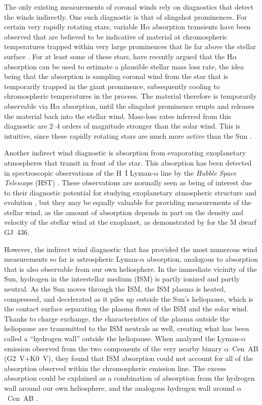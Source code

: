\documentclass[preprint]{aastex}
\begin{document}
     The only existing measurements of coronal winds rely on diagnostics
that detect the winds indirectly.  One such diagnostic is that of
slingshot prominences.  For certain very rapidly rotating stars, variable
H$\alpha$ absorption transients have been observed that are
believed to be indicative of material at chromospheric
temperatures trapped within very large prominences that lie far above
the stellar surface \citep{acc89}.  For at least
some of these stars, \citet{mj19} have recently argued
that the H$\alpha$ absorption can be used to estimate a plausible stellar
mass loss rate, the idea being that the absorption is sampling coronal wind
from the star that is temporarily trapped in the giant prominence,
subsequently cooling to chromospheric temperatures in the process.  The
material therefore is temporarily observable via H$\alpha$ absorption,
until the slingshot prominence erupts and releases the material
back into the stellar wind.  Mass-loss rates inferred from this diagnostic
are 2--4 orders of magnitude stronger than the solar wind.  This is
intuitive, since these rapidly rotating stars are much more active than
the Sun \citep{mj19}.

     Another indirect wind diagnostic is absorption from evaporating
exoplanetary atmospheres that transit in front of the star.  This
absorption has been detected in spectroscopic observations
of the H~I Lyman-$\alpha$ line by the {\em Hubble Space Telescope} (HST)
\citep{avm03,alde10,vb16}.  These observations are normally seen as being
of interest due to their diagnostic potential for studying
exoplanetary atmospheric structure and
evolution \citep[e.g.,][]{ae10,kgk14,ems16},
but they may be equally valuable for providing measurements of the
stellar wind, as the amount of absorption depends in part on the
density and velocity of the stellar wind at the exoplanet, as
demonstrated by \citet{aav17} for the M dwarf GJ~436.

     However, the indirect wind diagnostic that has provided the most
numerous wind measurements so far is astrospheric Lyman-$\alpha$
absorption, analogous to absorption that is also observable from
our own heliosphere.  In the immediate vicinity of the Sun,
hydrogen in the interstellar medium (ISM) is partly ionized and
partly neutral.  As the Sun moves through the ISM, the ISM plasma is
heated, compressed, and decelerated as it piles up outside the Sun's
heliopause, which is the contact surface separating the plasma flows
of the ISM and the solar wind.  Thanks to charge exchange, the
characteristics of the plasma outside the heliopause are transmitted
to the ISM neutrals as well, creating what has been called a ``hydrogen
wall'' outside the heliopause.  When \citet{jll96} analyzed the
Lyman-$\alpha$ emission observed from the two components of the very
nearby binary $\alpha$~Cen~AB (G2~V+K0~V), they found that ISM absorption
could not account for all of the absorption observed within the
chromospheric emission line.  The excess absorption could be explained
as a combination of absorption from the hydrogen wall around our own
heliosphere, and the analogous hydrogen wall around
$\alpha$~Cen~AB \citep{kgg97}.
\end{document}
